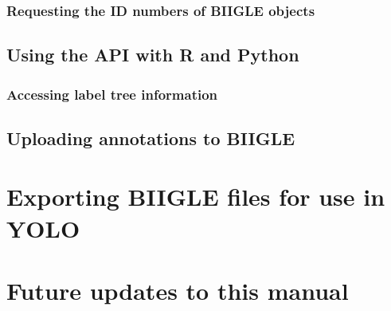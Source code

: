 \documentclass[
  letterpaper,
  DIV=11,
  numbers=noendperiod]{scrartcl}
\begin{document}
\hypertarget{requesting-the-id-numbers-of-biigle-objects}{%
\subsubsection{Requesting the ID numbers of BIIGLE
objects}\label{requesting-the-id-numbers-of-biigle-objects}}

\hypertarget{using-the-api-with-r-and-python}{%
\subsection{Using the API with R and
Python}\label{using-the-api-with-r-and-python}}

\hypertarget{accessing-label-tree-information}{%
\subsubsection{Accessing label tree
information}\label{accessing-label-tree-information}}

\hypertarget{uploading-annotations-to-biigle}{%
\subsection{Uploading annotations to
BIIGLE}\label{uploading-annotations-to-biigle}}

\hypertarget{exporting-biigle-files-for-use-in-yolo}{%
\section{Exporting BIIGLE files for use in
YOLO}\label{exporting-biigle-files-for-use-in-yolo}}

\hypertarget{future-updates-to-this-manual}{%
\section{Future updates to this
manual}\label{future-updates-to-this-manual}}
\end{document}

